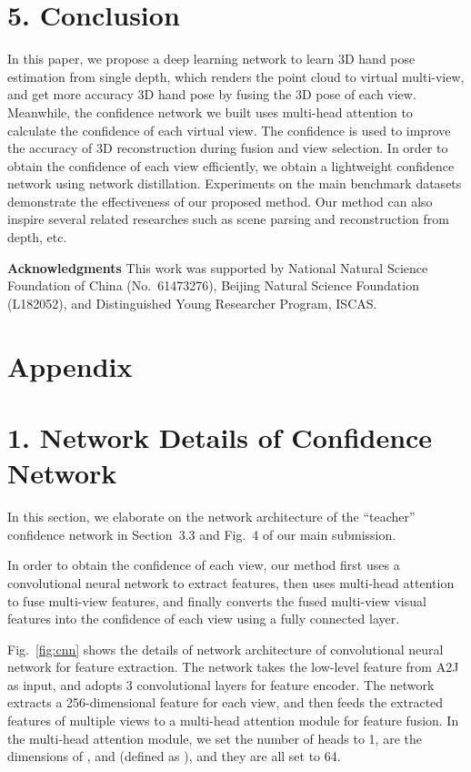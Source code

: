 \documentclass[letterpaper]{article} \usepackage{aaai22}  \usepackage{times}  \usepackage{helvet}  \usepackage{courier}  \usepackage[hyphens]{url}  \usepackage{graphicx} \urlstyle{rm} \def\UrlFont{\rm}  \usepackage{natbib}  \usepackage{caption} \DeclareCaptionStyle{ruled}{labelfont=normalfont,labelsep=colon,strut=off} \frenchspacing  \setlength{\pdfpagewidth}{8.5in}  \setlength{\pdfpageheight}{11in}  \usepackage{algorithm}
\begin{document}
\section{5. Conclusion}
In this paper, we propose a deep learning network to learn 3D hand pose estimation from single depth, which renders the point cloud to virtual multi-view, and get more accuracy 3D hand pose by fusing the 3D pose of each view. Meanwhile, the confidence network we built uses multi-head attention to calculate the confidence of each virtual view. The confidence is used to improve the accuracy of 3D reconstruction during fusion and view selection. In order to obtain the confidence of each view efficiently, we obtain a lightweight confidence network using network distillation. Experiments on the main benchmark datasets demonstrate the effectiveness of our proposed method. 
Our method can also inspire several related researches such as scene parsing and reconstruction from depth, etc.

\vspace{5mm}
\noindent \textbf{Acknowledgments} This work was supported by National Natural Science Foundation of China (No.~61473276), Beijing Natural Science Foundation (L182052), and Distinguished Young Researcher Program, ISCAS.


\newpage
\section*{Appendix}
\section{1. Network Details of Confidence Network}
In this section, we elaborate on the network architecture of the ``teacher'' confidence network in Section~3.3 and Fig.~4 of our main submission.

In order to obtain the confidence of each view, our method first uses a convolutional neural network to extract features, then uses multi-head attention \cite{vaswani2017attention} to fuse multi-view features, and finally converts the fused multi-view visual features into the confidence of each view using a fully connected layer. 

Fig.~\ref{fig:cnn} shows the details of network architecture of convolutional neural network for feature extraction. The network takes the low-level feature from A2J as input, and adopts 3 convolutional layers for feature encoder.
The network extracts a 256-dimensional feature for each view, and then feeds the extracted features of multiple views to a multi-head attention module \cite{vaswani2017attention} for feature fusion.
In the multi-head attention module, we 
set the number of heads  to 1,  are the dimensions of ,  and  (defined as \cite{vaswani2017attention}), and they are all set to 64. 
\end{document}
